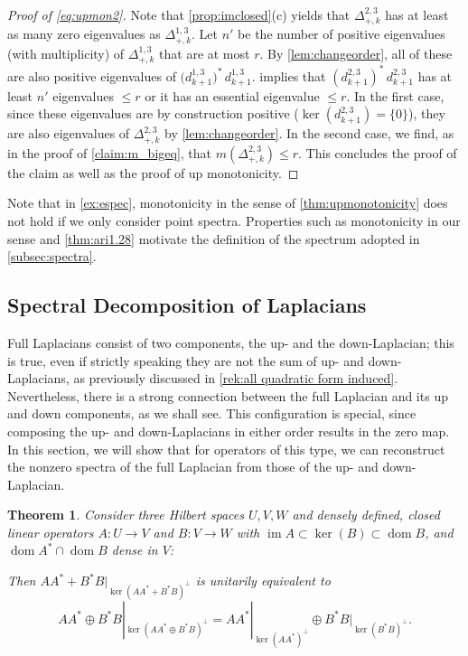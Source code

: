 \documentclass[11pt]{article}
\newtheorem{theorem}{Theorem}[section]
\theoremstyle{definition}
\theoremstyle{remark}
\DeclareMathOperator\dom{dom}
\DeclareMathOperator{\im}{im}
\begin{document}
\begin{proof}[Proof of \cref{eq:upmon2}]
Note that \cref{prop:imclosed}(c) yields that $\Delta_{+,k}^{2,3}$ has at least as many zero eigenvalues as $\Delta_{+,k}^{1,3}$. Let $n'$ be the number of positive eigenvalues (with multiplicity) of $\Delta_{+,k}^{1,3}$ that are at most $r$. By \cref{lem:changeorder}, all of these are also positive eigenvalues of $\big(d_{k+1}^{1,3}\big)^*\, d_{k+1}^{1,3}$.  implies that $(d_{k+1}^{2,3})^*\, d_{k+1}^{2,3}$ has at least $n'$ eigenvalues $\le r$ or it has an essential eigenvalue $\le r$. In the first case, since these eigenvalues are by construction positive ($\ker(d_{k+1}^{2,3})=\{0\}$), they are also eigenvalues of $\Delta_{+,k}^{2,3}$ by \cref{lem:changeorder}. In the second case, we find, as in the proof of \cref{claim:m_bigeq}, that $m(\Delta_{+,k}^{2,3})\le r$. This concludes the proof of the claim as well as the proof of up monotonicity.
\end{proof}

Note that in \cref{ex:espec}, monotonicity in the sense of \cref{thm:upmonotonicity} does not hold if we only consider point spectra. Properties such as monotonicity in our sense and \cref{thm:ari1.28} motivate the definition of the spectrum adopted in \cref{subsec:spectra}.

\subsection{Spectral Decomposition of Laplacians} \label{subsec:spectraldecomp}

Full Laplacians consist of two components, the up- and the down-Laplacian; this is true, even if strictly speaking they are not the sum of up- and down-Laplacians, as previously discussed in \cref{rek:all quadratic form induced}.  Nevertheless, there is a strong connection between the full Laplacian and its up and down components, as we shall see. This configuration is special, since composing the up- and down-Laplacians in either order results in the zero map. In this section, we will show that for operators of this type, we can reconstruct the nonzero spectra of the full Laplacian from those of the up- and down-Laplacian.

\begin{theorem} \label{thm:split}
    Consider three Hilbert spaces $U,V,W$ and densely defined, closed linear operators $A:U \rightarrow V$ and $B: V \rightarrow W$ with $\im A\subset \ker(B) \subset \dom B$, and $\dom A^*\cap \dom B$ dense in $V$:

\begin{center}
\end{center}    
    
    Then $AA^*+B^*B|_{\ker(AA^*+B^*B)^\perp}$ is unitarily equivalent to 
    $$
    AA^*\oplus B^*B|_{\ker(AA^*\oplus B^*B)^\perp}=AA^*|_{\ker(AA^*)^\perp} \oplus B^*B|_{\ker(B^*B)^\perp}.
    $$
\end{theorem}
\end{document}
